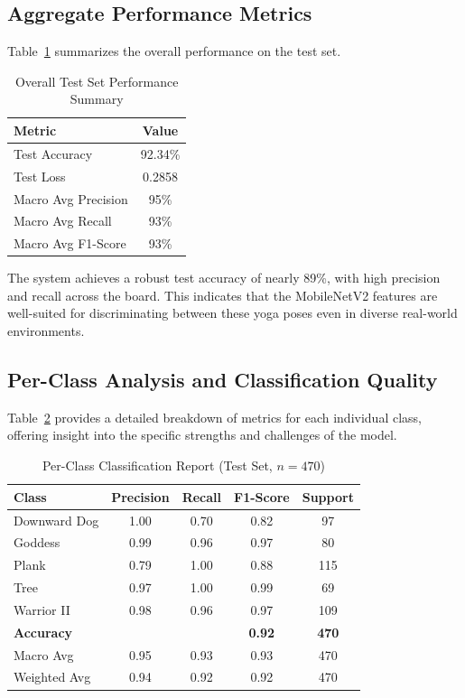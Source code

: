 \subsection{Aggregate Performance Metrics}
Table~\ref{tab:overall} summarizes the overall performance on the test set.

\begin{table}[H]
    \centering
    \caption{Overall Test Set Performance Summary}
    \begin{tabular}{|l|c|}
        \hline
        \textbf{Metric} & \textbf{Value} \\
        \hline
        Test Accuracy & 92.34\% \\
        \hline
        Test Loss & 0.2858 \\
        \hline
        Macro Avg Precision & 95\% \\
        \hline
        Macro Avg Recall & 93\% \\
        \hline
        Macro Avg F1-Score & 93\% \\
        \hline
    \end{tabular}
    \label{tab:overall}
\end{table}

The system achieves a robust test accuracy of nearly 89\%, with high precision and recall across the board. This indicates that the MobileNetV2 features are well-suited for discriminating between these yoga poses even in diverse real-world environments.

\subsection{Per-Class Analysis and Classification Quality}
Table~\ref{tab:classreport} provides a detailed breakdown of metrics for each individual class, offering insight into the specific strengths and challenges of the model.

\begin{table}[H]
    \centering
    \caption{Per-Class Classification Report (Test Set, $n = 470$)}
    \begin{tabular}{|l|c|c|c|c|}
        \hline
        \textbf{Class} & \textbf{Precision} & \textbf{Recall} & \textbf{F1-Score} & \textbf{Support} \\
        \hline
        Downward Dog & 1.00 & 0.70 & 0.82 & 97 \\
        \hline
        Goddess & 0.99 & 0.96 & 0.97 & 80 \\
        \hline
        Plank & 0.79 & 1.00 & 0.88 & 115 \\
        \hline
        Tree & 0.97 & 1.00 & 0.99 & 69 \\
        \hline
        Warrior II & 0.98 & 0.96 & 0.97 & 109 \\
        \hline
        \textbf{Accuracy} & & & \textbf{0.92} & \textbf{470} \\
        \hline
        Macro Avg & 0.95 & 0.93 & 0.93 & 470 \\
        \hline
        Weighted Avg & 0.94 & 0.92 & 0.92 & 470 \\
        \hline
    \end{tabular}
    \label{tab:classreport}
\end{table}

